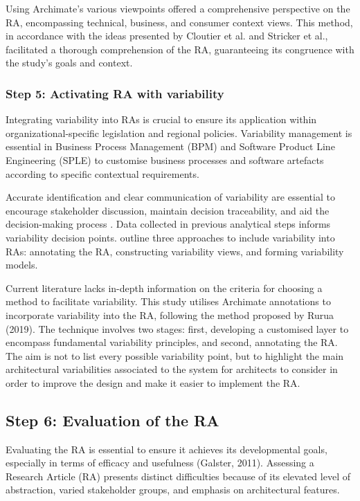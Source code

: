 \documentclass[journal]{IEEEtran}
\begin{document}
Using Archimate's various viewpoints offered a comprehensive perspective on the RA, encompassing technical, business, and consumer context views. This method, in accordance with the ideas presented by Cloutier et al. and Stricker et al., facilitated a thorough comprehension of the RA, guaranteeing its congruence with the study's goals and context.


\subsubsection{Step 5: Activating RA with variability}

Integrating variability into RAs is crucial to ensure its application within organizational-specific legislation and regional policies. Variability management is essential in Business Process Management (BPM) and Software Product Line Engineering (SPLE) to customise business processes and software artefacts according to specific contextual requirements.

Accurate identification and clear communication of variability are essential to encourage stakeholder discussion, maintain decision traceability, and aid the decision-making process \cite{czarnecki2012cool}. Data collected in previous analytical steps informs variability decision points. \cite{GALSTER2011Empirically} outline three approaches to include variability into RAs: annotating the RA, constructing variability views, and forming variability models.

Current literature lacks in-depth information on the criteria for choosing a method to facilitate variability. This study utilises Archimate annotations to incorporate variability into the RA, following the method proposed by Rurua (2019). The technique involves two stages: first, developing a customised layer to encompass fundamental variability principles, and second, annotating the RA. The aim is not to list every possible variability point, but to highlight the main architectural variabilities associated to the system for architects to consider in order to improve the design and make it easier to implement the RA.

\subsection{Step 6: Evaluation of the RA}

Evaluating the RA is essential to ensure it achieves its developmental goals, especially in terms of efficacy and usefulness (Galster, 2011). Assessing a Research Article (RA) presents distinct difficulties because of its elevated level of abstraction, varied stakeholder groups, and emphasis on architectural features.
\end{document}
